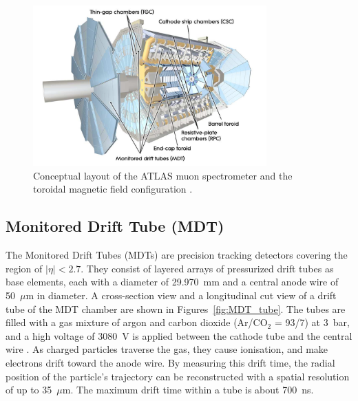 \begin{figure}[htbp]
  \centering
  \includegraphics[width=0.8\textwidth]{figs/chapter2/muon_system.png}
  \caption{Conceptual layout of the ATLAS muon spectrometer and the toroidal magnetic field configuration \cite{ATLASDetector2008}.}
  \label{fig:muon_system}
\end{figure}

\subsection{Monitored Drift Tube (MDT)}
The Monitored Drift Tubes (MDTs) are precision tracking detectors covering the region of $|\eta| < 2.7$. They consist of layered arrays of pressurized drift tubes as base elements, each with a diameter of 29.970~mm and a central anode wire of 50~$\mu$m in diameter. A cross-section view and a longitudinal cut view of a drift tube of the MDT chamber are shown in Figures~\ref{fig:MDT_tube}. The tubes are filled with a gas mixture of argon and carbon dioxide (Ar/CO$_2$ = 93/7) at 3~bar, and a high voltage of 3080~V is applied between the cathode tube and the central wire \cite{ATLASDetector2008}. As charged particles traverse the gas, they cause ionisation, and make electrons drift toward the anode wire. By measuring this drift time, the radial position of the particle's trajectory can be reconstructed with a spatial resolution of up to 35~$\mu$m. The maximum drift time within a tube is about 700~ns.


